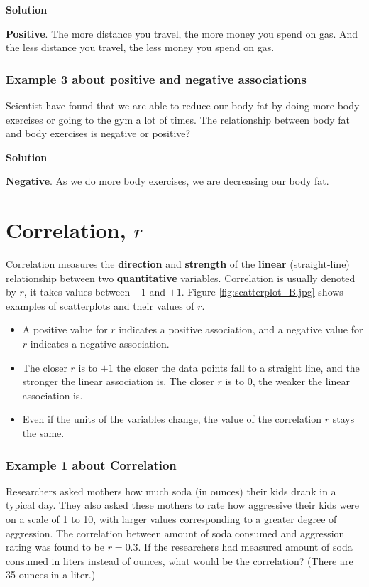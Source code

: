 \vspace{0.2cm}

\textbf{Solution}

\vspace{0.2cm}

\noindent \textbf{Positive}. The more distance you travel, the more money you spend on gas. And the less distance you travel, the less 
money you spend on gas. 

\subsubsection*{Example 3 about positive and negative associations}
Scientist have found that we are able to reduce our body fat by doing more body exercises or going to the gym a lot of times. The relationship between body fat and body exercises is negative or positive? 

\vspace{0.2cm}

\textbf{Solution}

\vspace{0.2cm}

\noindent \textbf{Negative}. As we do more body exercises, we are decreasing our body fat. 


\section{Correlation, $r$}
Correlation measures the \textbf{direction} and \textbf{strength} of the \textbf{linear} (straight-line) relationship between two \textbf{quantitative} variables. Correlation is usually denoted by $r$, it takes values between $-1$ and $+1$. Figure \ref{fig:scatterplot_B.jpg} shows examples of scatterplots and their values of $r$.
\begin{itemize}
    \item A positive value for $r$ indicates a positive association, and a negative value for $r$ indicates a negative association.
    \item The closer $r$ is to $\pm{1}$ the closer the data points fall to a straight line, and the stronger the linear association is. The closer $r$ is to $0$, the weaker the linear association is. 
    \item Even if the units of the variables change, the value of the correlation $r$ stays the same. 
\end{itemize}

\subsubsection*{Example 1 about Correlation}
Researchers asked mothers how much soda (in ounces) their kids drank in a typical day. They also asked these mothers to rate how aggressive their kids were on a scale of 1 to 10, with larger values corresponding to a greater degree of aggression. The correlation between amount of soda consumed and aggression rating was found to be $r = 0.3$. If the researchers had measured amount of soda consumed in liters instead of ounces, what would be the correlation? (There are 35 ounces in a liter.) 

